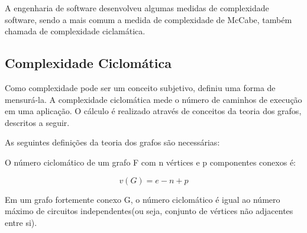 A engenharia de software desenvolveu algumas medidas de complexidade software, sendo a mais comum a medida de complexidade de McCabe, também chamada de complexidade ciclamática. 

\subsection{ Complexidade Ciclomática } \label{subsec:complexidade_ciclomatica}

Como complexidade pode ser um conceito subjetivo, \cite{mccabe1976complexity} definiu uma forma de mensurá-la. A complexidade ciclomática mede o número de caminhos de execução em uma aplicação. O cálculo é realizado através de conceitos da teoria dos grafos, descritos a seguir.

As seguintes definições da teoria dos grafos são necessárias:
\begin{definition}
O número ciclomático de um grafo F com n vértices e p componentes conexos é:
\end{definition}
\[ v(G) = e - n + p \]
\begin{theorem}
Em um grafo fortemente conexo G, o número ciclomático é igual ao número máximo de circuitos independentes(ou seja, conjunto de vértices não adjacentes entre si). 
\end{theorem}

